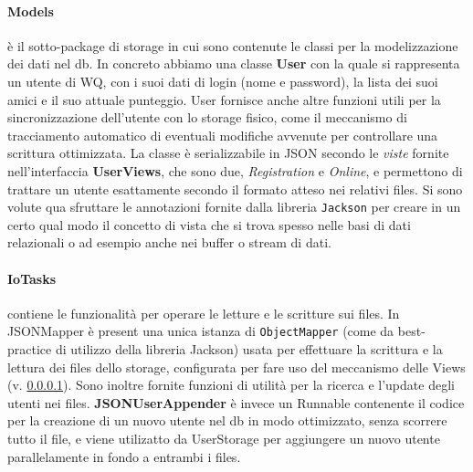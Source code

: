 \documentclass{article}
\begin{document}
    \paragraph{Models}\label{server_user} è il sotto-package di storage in cui sono contenute le classi per la modelizzazione dei dati nel db. In concreto abbiamo una classe \textbf{User} con la quale si rappresenta un utente di WQ, con i suoi dati di login (nome e password), la lista dei suoi amici e il suo attuale punteggio. User fornisce anche altre funzioni utili per la sincronizzazione dell'utente con lo storage fisico, come il meccanismo di tracciamento automatico di eventuali modifiche avvenute per controllare una scrittura ottimizzata. La classe è serializzabile in JSON secondo le \textit{viste} fornite nell'interfaccia \textbf{UserViews}, che sono due, \textit{Registration} e \textit{Online}, e permettono di trattare un utente esattamente secondo il formato atteso nei relativi files. Si sono volute qua sfruttare le annotazioni fornite dalla libreria \texttt{Jackson} per creare in un certo qual modo il concetto di vista che si trova spesso nelle basi di dati relazionali o ad esempio anche nei buffer o stream di dati.

    \paragraph{IoTasks}\label{server_ioTasks} contiene le funzionalità per operare le letture e le scritture sui files. In JSONMapper è present una unica istanza di \texttt{ObjectMapper} (come da best-practice di utilizzo della libreria Jackson) usata per effettuare la scrittura e la lettura dei files dello storage, configurata per fare uso del meccanismo delle Views (v. \ref{server_user}). Sono inoltre fornite funzioni di utilità per la ricerca e l'update degli utenti nei files. \textbf{JSONUserAppender} è invece un Runnable contenente il codice per la creazione di un nuovo utente nel db in modo ottimizzato, senza scorrere tutto il file, e viene utilizatto da UserStorage per aggiungere un nuovo utente parallelamente in fondo a entrambi i files.
\end{document}
